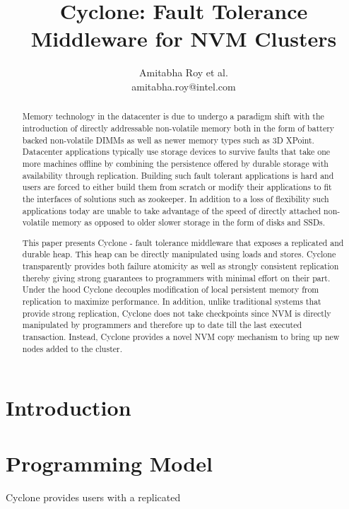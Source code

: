 \documentclass[twocolumn]{article}
\begin{document}
\title{Cyclone: Fault Tolerance Middleware for NVM Clusters}
\author{Amitabha Roy et al. \\ amitabha.roy@intel.com}
\maketitle
\begin{abstract}
Memory technology in the datacenter is due to undergo a paradigm shift with the
introduction of directly addressable non-volatile memory both in the form of
battery backed non-volatile DIMMs as well as newer memory types such as
3D XPoint. Datacenter applications typically use storage devices to survive
faults that take one more machines offline by combining the persistence offered by
durable storage with availability through replication. Building such fault
tolerant applications is hard and users are forced to either build
them from scratch or modify their applications to fit the interfaces of solutions
such as zookeeper. In addition to a loss of flexibility such applications today
are unable to take advantage of the speed of directly attached non-volatile
memory as opposed to older slower storage in the form of disks and SSDs.

This paper presents Cyclone - fault tolerance middleware that exposes a
replicated and durable heap. This heap can be directly manipulated using loads and
stores. Cyclone transparently provides both failure atomicity as well as
strongly consistent replication thereby giving strong guarantees to programmers
with minimal effort on their part. Under the hood Cyclone decouples modification
of local persistent memory from replication to maximize performance. In
addition, unlike traditional systems that provide strong replication, Cyclone
does not take checkpoints since NVM is directly manipulated by programmers and
therefore up to date till the last executed transaction. Instead, Cyclone
provides a novel NVM copy mechanism to bring up new nodes added to the cluster.
\end{abstract}  

\section{Introduction}

\section{Programming Model}
Cyclone provides users with a replicated 
\end{document}
